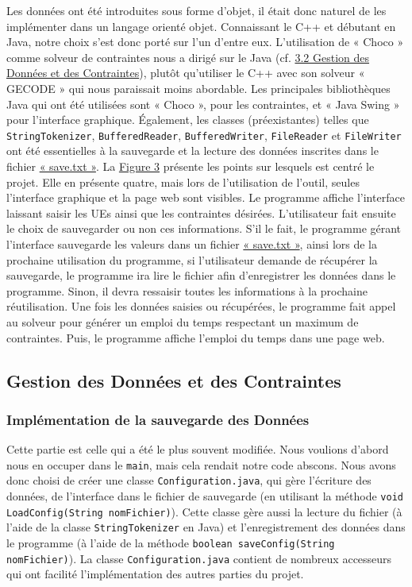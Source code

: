 \documentclass[12pt,a4paper]{article}
\begin{document}
Les données ont été introduites sous forme d'objet, il était donc naturel de les implémenter dans un langage orienté objet. Connaissant le C++ et débutant en Java, notre choix s'est donc porté sur l'un d'entre eux. L'utilisation de « Choco » comme solveur de contraintes nous a dirigé sur le Java (cf. \hyperref[contrainteimpl]{3.2 Gestion des Données et des Contraintes}), plutôt qu'utiliser le C++ avec son solveur « GECODE » qui nous paraissait moins abordable. 
Les principales bibliothèques Java qui ont été utilisées sont « Choco », pour les contraintes, et « Java Swing » pour l'interface graphique. \'{E}galement, les classes (préexistantes) telles que \texttt{StringTokenizer}, \texttt{BufferedReader}, \texttt{BufferedWriter}, \texttt{FileReader} et \texttt{FileWriter} ont été essentielles à la sauvegarde et la lecture des données inscrites dans le fichier \hyperref[save]{« save.txt »}.
La \hyperref[architecture]{Figure 3} présente les points sur lesquels est centré le projet. Elle en présente quatre, mais lors de l'utilisation de l'outil, seules l'interface graphique et la page web sont visibles. Le programme affiche l'interface laissant saisir les UEs ainsi que les contraintes désirées. L'utilisateur fait ensuite le choix de sauvegarder ou non ces informations. S'il le fait, le programme gérant l'interface sauvegarde les valeurs dans un fichier \hyperref[save]{« save.txt »}, ainsi lors de la prochaine utilisation du programme, si l'utilisateur demande de récupérer la sauvegarde, le programme ira lire le fichier afin d'enregistrer les données dans le programme. Sinon, il devra ressaisir toutes les informations à la prochaine réutilisation. Une fois les données saisies ou récupérées, le programme fait appel au solveur pour générer un emploi du temps respectant un maximum de contraintes. Puis, le programme affiche l'emploi du temps dans une page web.

\subsection{Gestion des Données et des Contraintes}
\label{contrainteimpl}

\subsubsection{Implémentation de la sauvegarde des Données}

Cette partie est celle qui a été le plus souvent modifiée. Nous voulions d'abord nous en occuper dans le \texttt{main}, mais cela rendait notre code abscons. Nous avons donc choisi de créer une classe \texttt{Configuration.java}, qui gère l'écriture des données, de l'interface dans le fichier de sauvegarde (en utilisant la méthode \texttt{void LoadConfig(String nomFichier)}). Cette classe gère aussi la lecture du fichier (à l'aide de la classe \texttt{StringTokenizer} en Java) et l'enregistrement des données dans le programme (à l'aide de la méthode \texttt{boolean saveConfig(String nomFichier)}). La classe \texttt{Configuration.java} contient de nombreux accesseurs qui ont facilité l'implémentation des autres parties du projet.
\end{document}
